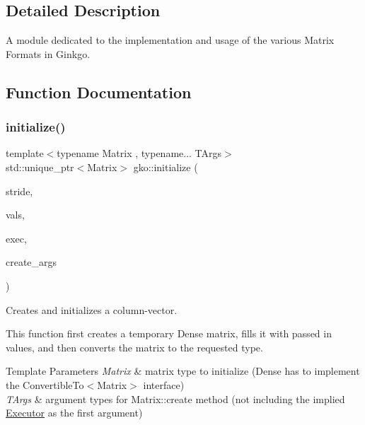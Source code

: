 \subsection{Detailed Description}
A module dedicated to the implementation and usage of the various Matrix Formats in Ginkgo. 



\subsection{Function Documentation}
\mbox{\label{group__mat__formats_ga2f54bac1e95fb3ef03974fa9c9088491}} 
\subsubsection{\texorpdfstring{initialize()}{initialize()}\hspace{0.1cm}{\footnotesize\ttfamily [1/4]}}
{\footnotesize\ttfamily template$<$typename Matrix , typename... T\+Args$>$ \\
std\+::unique\+\_\+ptr$<$Matrix$>$ gko\+::initialize (\begin{DoxyParamCaption}\item[{\hyperlink{namespacegko_a6e5c95df0ae4e47aab2f604a22d98ee7}{size\+\_\+type}}]{stride,  }\item[{std\+::initializer\+\_\+list$<$ typename Matrix\+::value\+\_\+type $>$}]{vals,  }\item[{std\+::shared\+\_\+ptr$<$ const \hyperlink{classgko_1_1Executor}{Executor} $>$}]{exec,  }\item[{T\+Args \&\&...}]{create\+\_\+args }\end{DoxyParamCaption})}



Creates and initializes a column-\/vector. 

This function first creates a temporary Dense matrix, fills it with passed in values, and then converts the matrix to the requested type.


\begin{DoxyTemplParams}{Template Parameters}
{\em Matrix} & matrix type to initialize (Dense has to implement the Convertible\+To$<$\+Matrix$>$ interface) \\
\hline
{\em T\+Args} & argument types for Matrix\+::create method (not including the implied \hyperlink{classgko_1_1Executor}{Executor} as the first argument)\\
\hline
\end{DoxyTemplParams}

